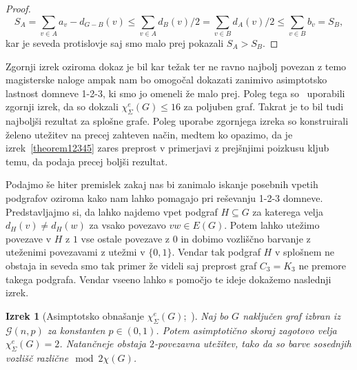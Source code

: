 \documentclass[12pt,a4paper,twoside]{article}
\theoremstyle{definition} %
\theoremstyle{plain} %
\newtheorem{izrek}[definicija]{Izrek}
\newcommand{\ec}{\chi_{\Sigma}^e}
\numberwithin{equation}{section}  %
\begin{document}
\begin{proof}
$$ S_A =  \sum_{v\in A}a_v - d_{G-B}(v) \le \sum_{v \in A} d_B(v)/2 = \sum_{v \in B} d_A(v) /2 \le \sum_{v \in B} b_v = S_B,$$
kar je seveda protislovje saj smo malo prej pokazali $S_A > S_B$.
 \end{proof}

Zgornji izrek oziroma dokaz je bil kar težak ter ne ravno najbolj povezan z temo magisterske naloge ampak nam bo omogočal dokazati zanimivo asimptotsko lastnost domneve 1-2-3, ki smo jo omeneli že malo prej. Poleg tega so~\citet{random12} uporabili zgornji izrek, da so dokzali $\ec(G) \le 16$ za poljuben graf. Takrat je to bil tudi najboljši rezultat za splošne grafe. Poleg uporabe zgornjega izreka so konstruirali želeno utežitev na precej zahteven način, medtem ko opazimo, da je izrek~\ref{theorem12345} zares preprost v primerjavi z prejšnjimi poizkusu kljub temu, da podaja precej boljši rezultat.

Podajmo še hiter premislek zakaj nas bi zanimalo iskanje posebnih vpetih podgrafov oziroma kako nam lahko pomagajo pri reševanju 1-2-3 domneve. Predstavljajmo si, da lahko najdemo vpet podgraf $H \subseteq G$ za katerega velja $d_H(v) \neq d_H(w)$ za vsako povezavo $vw \in E(G)$. Potem lahko utežimo povezave v $H$ z $1$ vse ostale povezave z $0$ in dobimo vozliščno barvanje z uteženimi povezavami z utežmi v $\{0,1\}$. Vendar tak podgraf $H$ v splošnem ne obstaja in seveda smo tak primer že videli saj preprost graf $C_3 = K_3$ ne premore takega podgrafa. Vendar vseeno lahko s pomočjo te ideje dokažemo naslednji izrek.

\begin{izrek}[Asimptotsko obnašanje $\ec(G)$;~\citet{random12}]
Naj bo $G$ naključen graf izbran iz $\mathcal{G}(n,p)$ za konstanten $p \in (0,1)$. Potem asimptotično skoraj zagotovo velja $\ec(G) = 2$. Natančneje obstaja $2$-povezavna utežitev, tako da so barve sosednjih vozlišč različne$\mod 2 \chi(G)$.
\end{izrek}
\end{document}
